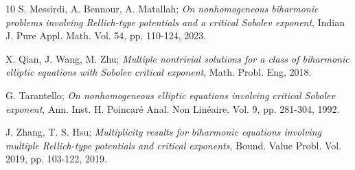 \documentclass[reqno]{amsart}
\begin{document}
\begin{thebibliography}{10}
 S. Messirdi, A. Bennour, A. Matallah;
\emph{On nonhomogeneous biharmonic problems involving Rellich-type potentials and 
a critical Sobolev exponent}, Indian J. Pure Appl. Math. Vol. 54, pp. 110-124, 2023.

 X. Qian, J. Wang, M. Zhu;
\emph{Multiple nontrivial solutions for a class of biharmonic elliptic equations 
with Sobolev critical exponent}, Math. Probl. Eng, 2018.

 G. Tarantello;
\emph{On nonhomogeneous elliptic equations involving critical Sobolev exponent}, 
Ann. Inst. H. Poincar\'e Anal. Non Lin\'eaire. Vol. 9, pp. 281-304, 1992.

 J. Zhang, T. S. Hsu;
\emph{Multiplicity results for biharmonic equations involving multiple Rellich-type 
potentials and critical exponents}, Bound. Value Probl. Vol. 2019, pp. 103-122, 2019.

\end{thebibliography}
\end{document}
